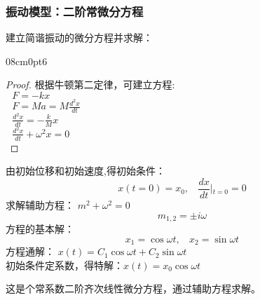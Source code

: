 \subsubsection{振动模型：二阶常微分方程}
\begin{example} %
	建立简谐振动的微分方程并求解：\\
   \opencutright 
   \def\windowpagestuff{\flushright 
 	\begin{tikzpicture}
 	\draw  (-2,0) -- (2,0) node[below] {};
 	\draw  (0,0) -- (0,-3) node[below] {$x$};	
 	\draw [orange, domain=0:-2, samples=200] plot({sin(\x r *30},\x);
 	\draw [fill, black, circle] (0,-2.5) circle(0.3ex) node[right] {$M$};
\end{tikzpicture}  } 
\begin{cutout} {0}{8cm}{0pt}{6}
\begin{proof} 
	根据牛顿第二定律，可建立方程:\\
		$\displaystyle~~~F = -k x$ \\
		$\displaystyle~~~F  = Ma =M\frac{d^2 x}{d t} $\\
		$\displaystyle~~~\frac{d^2 x}{d t} = -\frac{k}{M} x$\\
		$\displaystyle~~~\frac{d^2 x}{d t} +\omega ^2 x = 0$\\				
\end{proof}
 \end{cutout} 
由初始位移和初始速度,得初始条件：
	\begin{equation*}
	x(t=0)=x_0, ~~~~ \frac{dx}{dt} \left |_{t=0}  =0 \right.      
	\end{equation*}
  求解辅助方程： $m^2+\omega ^2=0$ \\
  	\begin{equation*}
  	m_{1, 2} =\pm i\omega     
    \end{equation*}
  方程的基本解： 
	\begin{equation*}
		x_{1} =\cos \omega t  , ~~~~	x_{2} =\sin \omega t     
	\end{equation*}
  方程通解： $x(t)=C_1 \cos \omega t +C_2 \sin \omega t $ \\
  初始条件定系数，得特解：$x(t)=x_0 \cos \omega t $ \\
\end{example}

\begin{remark}
这是个常系数二阶齐次线性微分方程，通过辅助方程求解。 
\end{remark}

